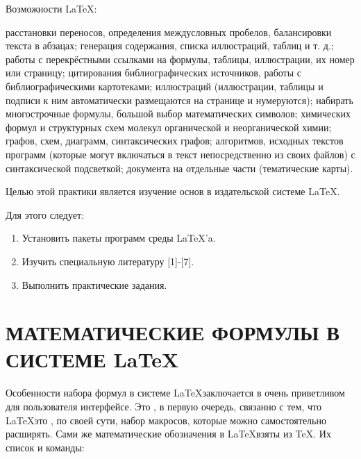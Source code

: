 \documentclass[a4paper,14pt,russian]{extreport}
\begin{document}
\newpage
Возможности \LaTeX:
\begin{itemize}
     расстановки переносов, определения междусловных пробелов, балансировки текста в абзацах;
     генерация содержания, списка иллюстраций, таблиц и т. д.;
     работы с перекрёстными ссылками на формулы, таблицы, иллюстрации, их номер или страницу;
     цитирования библиографических источников, работы с библиографическими картотеками;
     иллюстраций (иллюстрации, таблицы и подписи к ним автоматически размещаются на странице и нумеруются);
     набирать многострочные формулы, большой выбор математических символов;
     химических формул и структурных схем молекул органической и неорганической химии;
     графов, схем, диаграмм, синтаксических графов;
     алгоритмов, исходных текстов программ (которые могут включаться в текст непосредственно из своих файлов) с синтаксической подсветкой;
     документа на отдельные части (тематические карты).
\end{itemize}

Целью этой практики является изучение основ в издательской системе \LaTeX. 

\medskip
Для этого следует:
\begin{enumerate}

\renewcommand{\theenumi}{1}
\item Установить пакеты программ среды \LaTeX 'a. 

\renewcommand{\theenumi}{2}
\item Изучить специальную литературу [1]-[7].

\renewcommand{\theenumi}{3}
\item Выполнить практические задания. 
\end{enumerate}


\newpage
\chapter{МАТЕМАТИЧЕСКИЕ ФОРМУЛЫ В СИСТЕМЕ LaTeX}

Особенности набора формул в системе \LaTeX заключается в очень приветливом для пользователя интерфейсе. Это , в первую очередь, связанно с тем, что \LaTeX  это , по своей сути, набор макросов, которые можно самостоятельно расширять. Сами же математические обозначения  в \LaTeX взяты из \TeX. Их список и команды:
\end{document}
